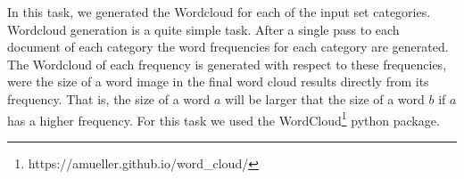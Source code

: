 In this task, we generated the Wordcloud for each of the input set categories. Wordcloud generation is a quite simple task. After a single pass to each document of each category the word frequencies for each category are generated. The Wordcloud of each frequency is generated with respect to these frequencies, were the size of a word image in the final word cloud results directly from its frequency. That is, the size of a word $a$ will be larger that the size of a word $b$ if $a$ has a higher frequency. For this task we used the WordCloud\footnote{https://amueller.github.io/word\_cloud/} python package.
